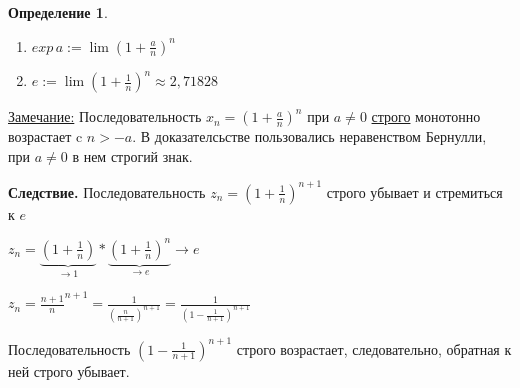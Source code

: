 \documentclass[12pt,letterpaper]{report}
\makeatletter
\newtheorem{conj}[theorem]{Определение}
\renewenvironment{proof}[1][\proofname]{%
   \par\pushQED{\qed}\normalfont%
   \topsep6\p@\@plus6\p@\relax
   \trivlist\item[\hskip\labelsep\bfseries#1\@addpunct{.}]%
   \ignorespaces
}{%
   \popQED\endtrivlist\@endpefalse
}
\makeatother
\begin{document}
\begin{conj} \quad \\
    \begin{enumerate}
        \item $exp\,a := \lim (1 + \frac{a}{n})^n$
        \item $e := \lim (1 + \frac{1}{n})^n \approx 2,71828$
    \end{enumerate}
\end{conj}
\underline{Замечание:} Последовательность $x_n = (1 + \frac{a}{n})^n$ при $a \neq 0$ \underline{строго} монотонно возрастает c $n > -a$. В доказателсьстве пользовались неравенством Бернулли, при $a \neq 0$ в нем строгий знак.
\vspace{0.5cm}

\textbf{Следствие.} Последовательность $z_n = (1 + \frac{1}{n})^{n+1}$ строго убывает и стремиться к $e$
\begin{proof}
    $z_n = \underbrace{(1 + \frac{1}{n})}_{\to 1} * \underbrace{(1 + \frac{1}{n})^n}_{\to e} \to e$
    
    $z_n = \frac{n + 1}{n}^{n+1} = \frac{1}{(\frac{n}{n+1})^{n+1}} = \frac{1}{(1 - \frac{1}{n+1})^{n+1}}$
    
    Последовательность $(1 - \frac{1}{n+1})^{n+1}$ строго возрастает, следовательно, обратная к ней строго убывает. 
\end{proof}
\end{document}
